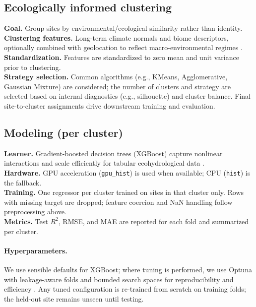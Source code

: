 \documentclass[graybox]{svmult}
\begin{document}
\subsection{Ecologically informed clustering}
\label{subsec:clustering}
\textbf{Goal.} Group sites by environmental/ecological similarity rather than identity. \\
\textbf{Clustering features.} Long-term climate normals and biome descriptors, optionally combined with geolocation to reflect macro-environmental regimes \cite{peel_updated_2007}. \\
\textbf{Standardization.} Features are standardized to zero mean and unit variance prior to clustering. \\
\textbf{Strategy selection.} Common algorithms (e.g., KMeans, Agglomerative, Gaussian Mixture) are considered; the number of clusters and strategy are selected based on internal diagnostics (e.g., silhouette) and cluster balance. Final site-to-cluster assignments drive downstream training and evaluation.

\subsection{Modeling (per cluster)}
\label{subsec:modeling}
\textbf{Learner.} Gradient-boosted decision trees (XGBoost) capture nonlinear interactions and scale efficiently for tabular ecohydrological data \cite{chen_xgboost_2016}. \\
\textbf{Hardware.} GPU acceleration (\texttt{gpu\_hist}) is used when available; CPU (\texttt{hist}) is the fallback. \\
\textbf{Training.} One regressor per cluster trained on sites in that cluster only. Rows with missing target are dropped; feature coercion and NaN handling follow preprocessing above. \\
\textbf{Metrics.} Test $R^2$, RMSE, and MAE are reported for each fold and summarized per cluster.

\paragraph{Hyperparameters.}
We use sensible defaults for XGBoost; where tuning is performed, we use Optuna with leakage-aware folds and bounded search spaces for reproducibility and efficiency \cite{akiba_optuna_2019}. Any tuned configuration is re-trained from scratch on training folds; the held-out site remains unseen until testing.
\end{document}
